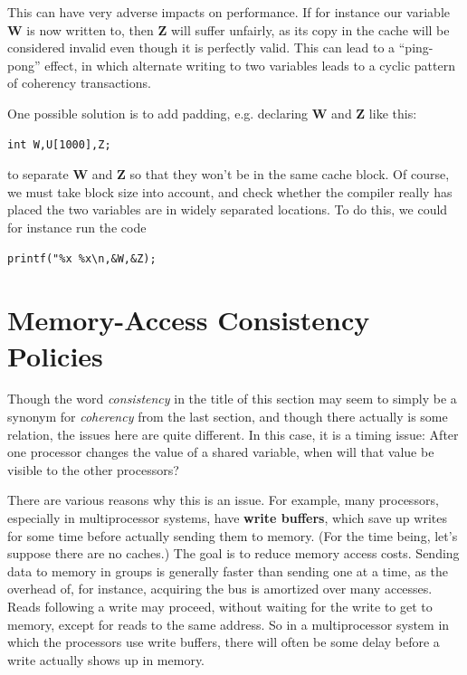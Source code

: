 This can have very adverse impacts on performance.  If for instance our
variable {\bf W} is now written to, then {\bf Z} will suffer unfairly,
as its copy in the cache will be considered invalid even though it is
perfectly valid.  This can lead to a ``ping-pong'' effect, in which
alternate writing to two variables leads to a cyclic pattern of
coherency transactions.

One possible solution is to add padding, e.g. declaring {\bf W} and {\bf
Z} like this:

\begin{Verbatim}[fontsize=\relsize{-2}]
int W,U[1000],Z;
\end{Verbatim}

to separate {\bf W} and {\bf Z} so that they won't be in the same cache
block.  Of course, we must take block size into account, and check
whether the compiler really has placed the two variables are in widely
separated locations.  To do this, we could for instance run the code

\begin{Verbatim}[fontsize=\relsize{-2}]
printf("%x %x\n,&W,&Z);
\end{Verbatim}

\section{Memory-Access Consistency Policies}
\label{consistency}

Though the word {\it consistency} in the title of this section may seem
to simply be a synonym for {\it coherency} from the last section, and
though there actually is some relation, the issues here are quite
different.  In this case, it is a timing issue:  After one processor
changes the value of a shared variable, when will that value be
visible to the other processors?

There are various reasons why this is an issue.  For example, many
processors, especially in multiprocessor systems, have {\bf write
buffers}, which save up writes for some time before actually sending
them to memory.  (For the time being, let's suppose there are no
caches.) The goal is to reduce memory access costs.  Sending data to
memory in groups is generally faster than sending one at a time, as the
overhead of, for instance, acquiring the bus is amortized over many
accesses.  Reads following a write may proceed, without waiting for the
write to get to memory, except for reads to the same address.  So in a
multiprocessor system in which the processors use write buffers, there
will often be some delay before a write actually shows up in memory.

